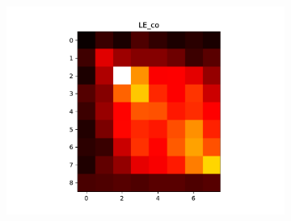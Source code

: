 \begin{figure}[H]
\begin{subfigure}{0.48\textwidth}
\includegraphics[width = \textwidth]{../fig/heatmap_LE_co.pdf}
\end{subfigure}
\end{figure}
